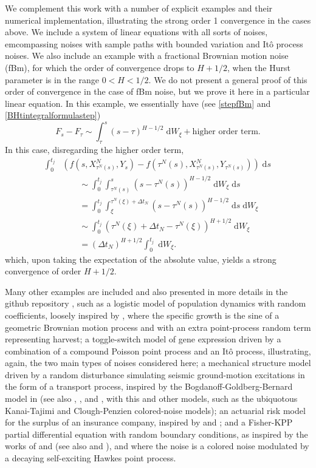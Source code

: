 \documentclass[reqno,12pt]{amsart}
\theoremstyle{plain} %
\theoremstyle{definition} %
\begin{document}
We complement this work with a number of explicit examples and their numerical implementation, illustrating the strong order 1 convergence in the cases above. We include a system of linear equations with all sorts of noises, emcompassing noises with sample paths with bounded variation and It\^o process noises. We also include an example with a fractional Brownian motion noise (fBm), for which the order of convergence drops to $H + 1/2$, when the Hurst parameter is in the range $0 < H < 1/2$. We do not present a general proof of this order of convergence in the case of fBm noise, but we prove it here in a particular linear equation. In this example, we essentially have (see \eqref{stepfBm} and \eqref{BHtintegralformulastep})
\[
    F_s - F_\tau \sim \int_\tau^s (s-\tau)^{H-1/2}\;\mathrm{d}W_\xi + \text{higher order term}.
\]
In this case, disregarding the higher order term,
\begin{align*}
    \int_0^{t_j} & \left( f(s, X_{\tau^N(s)}^N, Y_s) - f(\tau^N(s), X_{\tau^N(s)}^N, Y_{\tau^N(s)}) \right)\;\mathrm{d}s \\ 
    & \qquad \sim \int_0^{t_j} \int_{\tau^N(s)}^s (s-\tau^N(s))^{H-1/2} \;\mathrm{d} W_\xi\;\mathrm{d}s \\
    & \qquad = \int_0^{t_j} \int_{\xi}^{\tau^N(\xi) + \Delta t_N} (s-\tau^N(s))^{H-1/2} \;\mathrm{d}s \;\mathrm{d} W_\xi \\
    & \qquad \sim \int_0^{t_j} (\tau^N(\xi) + \Delta t_N - \tau^N(\xi))^{H+1/2} \;\mathrm{d} W_\xi \\
    & \qquad = (\Delta t_N)^{H+1/2} \int_0^{t_j} \;\mathrm{d} W_\xi.
\end{align*}
which, upon taking the expectation of the absolute value, yields a strong convergence of order $H + 1/2$.

Many other examples are included and also presented in more details in the github repository \cite{RODEConvEM2023}, such as a logistic model of population dynamics with random coefficients, loosely inspired by \cite[Section 15.2]{HanKloeden2017}, where the specific growth is the sine of a geometric Brownian motion process and with an extra point-process random term representing harvest; a toggle-switch model of gene expression driven by a combination of a compound Poisson point process and an It\^o process, illustrating, again, the two main types of noises considered here; a mechanical structure model driven by a random disturbance simulating seismic ground-motion excitations in the form of a transport process, inspired by the Bogdanoff-Goldberg-Bernard model in \cite{BogdanoffGoldbergBernard1961} (see also \cite[Chapter 18]{NeckelRupp2013}, \cite{HousnerJenning1964}, and \cite{Kanai1957}, with this and other models, such as the ubiquotous Kanai-Tajimi and Clough-Penzien colored-noise models); an actuarial risk model for the surplus of an insurance company, inspired by \cite{GerberShiu1998} and \cite{BrigoMercurio2006}; and a Fisher-KPP partial differential equation with random boundary conditions, as inspired by the works of \cite{SalakoShen2020} and \cite{FreidlinWentzell1992} (see also \cite{Fisher1937} and \cite{KPP1937}), and where the noise is a colored noise modulated by a decaying self-exciting Hawkes point process.
\end{document}
